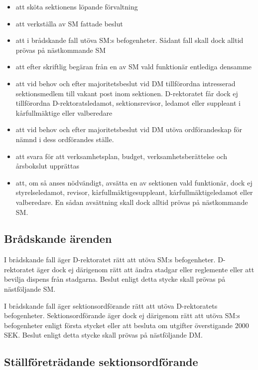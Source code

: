 \documentclass{dgovdoc}
\begin{document}
\begin{itemize}
  \item att sköta sektionens löpande förvaltning
  \item att verkställa av SM fattade beslut
  \item att i brådskande fall utöva SM:s befogenheter. Sådant fall skall dock
    alltid prövas på nästkommande SM
  \item att efter skriftlig begäran från en av SM vald funktionär entlediga
    densamme
  \item att vid behov och efter majoritetsbeslut vid DM tillförordna
    intresserad sektionsmedlem till vakant post inom sektionen. D-rektoratet
    får dock ej tillförordna D-rektoratsledamot, sektionsrevisor, ledamot eller
    suppleant i kårfullmäktige eller valberedare
  \item att vid behov och efter majoritetsbeslut vid DM utöva ordförandeskap
    för nämnd i dess ordförandes ställe.
  \item att svara för att verksamhetsplan, budget, verksamhetsberättelse och
    årsbokslut upprättas
  \item att, om så anses nödvändigt, avsätta en av sektionen vald funktionär,
    dock ej styrelseledamot, revisor, kårfullmäktigesuppleant,
    kårfullmäktigeledamot eller valberedare. En sådan avsättning skall dock
    alltid prövas på nästkommande SM.
\end{itemize}

\subsection{Brådskande ärenden}

I brådskande fall äger D-rektoratet rätt att utöva SM:s befogenheter.
D-rektoratet äger dock ej därigenom rätt att ändra stadgar eller reglemente
eller att bevilja dispens från stadgarna. Beslut enligt detta stycke skall
prövas på nästföljande SM.

I brådskande fall äger sektionsordförande rätt att utöva D-rektoratets
befogenheter. Sektionsordförande äger dock ej därigenom rätt att utöva SM:s
befogenheter enligt första stycket eller att besluta om utgifter överstigande
2000 SEK. Beslut enligt detta stycke skall prövas på nästföljande DM.

\subsection{Ställföreträdande sektionsordförande}
\end{document}
